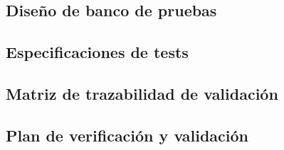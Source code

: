 \documentclass[../../main.tex]{subfiles}
\begin{document}
\subsection{Diseño de banco de pruebas}\label{subsec:dis_banco}


\subsection{Especificaciones de tests}\label{subsec:especificaciones_test}


\subsection{Matriz de trazabilidad de validación}\label{subsec:matriz}


\subsection{Plan de verificación y validación}\label{subsec:plan}

\end{document}
